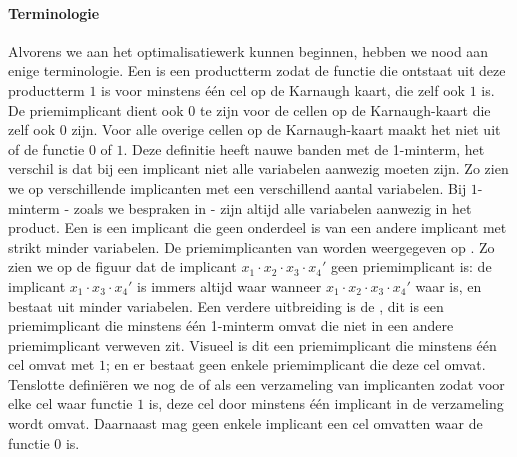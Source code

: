 \paragraph{Terminologie}
Alvorens we aan het optimalisatiewerk kunnen beginnen, hebben we nood aan enige terminologie. Een  is een productterm zodat de functie die ontstaat uit deze productterm $1$ is voor minstens \'e\'en cel op de Karnaugh kaart, die zelf ook $1$ is. De priemimplicant dient ook $0$ te zijn voor de cellen op de Karnaugh-kaart die zelf ook $0$ zijn. Voor alle overige cellen op de Karnaugh-kaart maakt het niet uit of de functie $0$ of $1$. Deze definitie heeft nauwe banden met de 1-minterm, het verschil is dat bij een implicant niet alle variabelen aanwezig moeten zijn. Zo zien we op  verschillende implicanten met een verschillend aantal variabelen. Bij $1$-minterm - zoals we bespraken in  - zijn altijd alle variabelen aanwezig in het product. Een  is een implicant die geen onderdeel is van een andere implicant met strikt minder variabelen. De priemimplicanten van  worden weergegeven op . Zo zien we op de figuur dat de implicant $x_1\cdot x_2\cdot x_3\cdot x_4'$ geen priemimplicant is: de implicant $x_1\cdot x_3\cdot x_4'$ is immers altijd waar wanneer $x_1\cdot x_2\cdot x_3\cdot x_4'$ waar is, en bestaat uit minder variabelen. Een verdere uitbreiding is de , dit is een priemimplicant die minstens \'e\'en 1-minterm omvat die niet in een andere priemimplicant verweven zit. Visueel is dit een priemimplicant die minstens \'e\'en cel omvat met $1$; en er bestaat geen enkele priemimplicant die deze cel omvat. Tenslotte defini\"eren we nog de  of  als een verzameling van implicanten zodat voor elke cel waar functie $1$ is, deze cel door minstens \'e\'en implicant in de verzameling wordt omvat. Daarnaast mag geen enkele implicant een cel omvatten waar de functie $0$ is.

